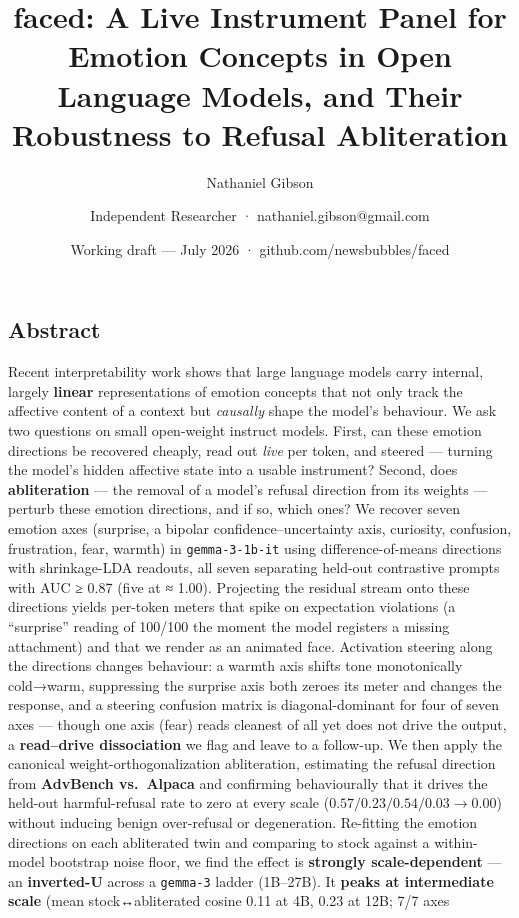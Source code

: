 \documentclass[
]{article}
\title{faced: A Live Instrument Panel for Emotion Concepts in Open
Language Models, and Their Robustness to Refusal Abliteration}
\author{Nathaniel Gibson \and Independent Researcher ·
nathaniel.gibson@gmail.com}
\date{Working draft --- July 2026 · github.com/newsbubbles/faced}
\begin{document}
\maketitle

\subsection{Abstract}\label{abstract}

Recent interpretability work shows that large language models carry
internal, largely \textbf{linear} representations of emotion concepts
that not only track the affective content of a context but
\emph{causally} shape the model's behaviour. We ask two questions on
small open-weight instruct models. First, can these emotion directions
be recovered cheaply, read out \emph{live} per token, and steered ---
turning the model's hidden affective state into a usable instrument?
Second, does \textbf{abliteration} --- the removal of a model's refusal
direction from its weights --- perturb these emotion directions, and if
so, which ones? We recover seven emotion axes (surprise, a bipolar
confidence--uncertainty axis, curiosity, confusion, frustration, fear,
warmth) in \texttt{gemma-3-1b-it} using difference-of-means directions
with shrinkage-LDA readouts, all seven separating held-out contrastive
prompts with AUC ≥ 0.87 (five at ≈ 1.00). Projecting the residual stream
onto these directions yields per-token meters that spike on expectation
violations (a ``surprise'' reading of 100/100 the moment the model
registers a missing attachment) and that we render as an animated face.
Activation steering along the directions changes behaviour: a warmth
axis shifts tone monotonically cold→warm, suppressing the surprise axis
both zeroes its meter and changes the response, and a steering confusion
matrix is diagonal-dominant for four of seven axes --- though one axis
(fear) reads cleanest of all yet does not drive the output, a
\textbf{read--drive dissociation} we flag and leave to a follow-up. We
then apply the canonical weight-orthogonalization abliteration,
estimating the refusal direction from \textbf{AdvBench vs.~Alpaca} and
confirming behaviourally that it drives the held-out harmful-refusal
rate to zero at every scale (\(0.57/0.23/0.54/0.03 \to 0.00\)) without
inducing benign over-refusal or degeneration. Re-fitting the emotion
directions on each abliterated twin and comparing to stock against a
within-model bootstrap noise floor, we find the effect is
\textbf{strongly scale-dependent} --- an \textbf{inverted-U} across a
\texttt{gemma-3} ladder (1B--27B). It \textbf{peaks at intermediate
scale} (mean stock↔abliterated cosine 0.11 at 4B, 0.23 at 12B; 7/7 axes
\end{document}
